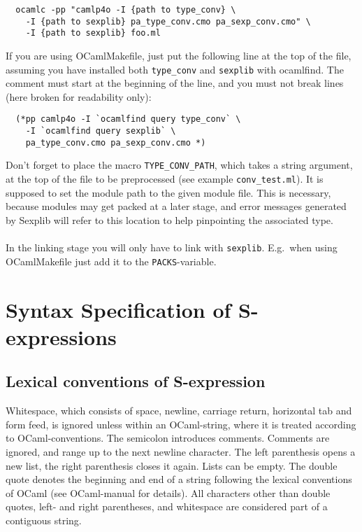 \documentclass[a4paper]{article}
\begin{document}
\begin{verbatim}
  ocamlc -pp "camlp4o -I {path to type_conv} \
    -I {path to sexplib} pa_type_conv.cmo pa_sexp_conv.cmo" \
    -I {path to sexplib} foo.ml
\end{verbatim}

If you are using OCamlMakefile, just put the following line at the
top of the file, assuming you have installed both \verb=type_conv= and
\verb=sexplib= with ocamlfind.  The comment must start at the beginning of
the line, and you must not break lines (here broken for readability only):

\begin{verbatim}
  (*pp camlp4o -I `ocamlfind query type_conv` \
    -I `ocamlfind query sexplib` \
    pa_type_conv.cmo pa_sexp_conv.cmo *)
\end{verbatim}

Don't forget to place the macro \verb=TYPE_CONV_PATH=, which takes a
string argument, at the top of the file to be preprocessed (see example
\verb=conv_test.ml=).  It is supposed to set the module path to the given
module file.  This is necessary, because modules may get packed at a later
stage, and error messages generated by Sexplib will refer to this location
to help pinpointing the associated type.\\
\\
In the linking stage you will only have to link with \verb=sexplib=.
E.g.\ when using OCamlMakefile just add it to the \verb=PACKS=-variable.

\section{Syntax Specification of S-expressions}

\subsection{Lexical conventions of S-expression}

Whitespace, which consists of space, newline, carriage return, horizontal
tab and form feed, is ignored unless within an OCaml-string, where it
is treated according to OCaml-conventions.  The semicolon introduces
comments.  Comments are ignored, and range up to the next newline
character.  The left parenthesis opens a new list, the right parenthesis
closes it again.  Lists can be empty.  The double quote denotes the
beginning and end of a string following the lexical conventions of OCaml
(see OCaml-manual for details).  All characters other than double quotes,
left- and right parentheses, and whitespace are considered part of a
contiguous string.
\end{document}
